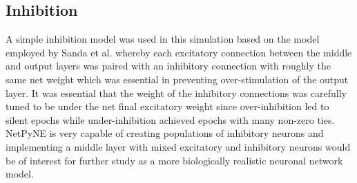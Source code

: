 \documentclass[11pt, twocolumn]{article}
\begin{document}
\subsection*{Inhibition}
A simple inhibition model was used in this simulation based on the model employed by Sanda et al. \cite{sanda2017multi} whereby each excitatory connection between the middle and output layers was paired with an inhibitory connection with roughly the same net weight which was essential in preventing over-stimulation of the output layer. It was essential that the weight of the inhibitory connections was carefully tuned to be under the net final excitatory weight since over-inhibition led to silent epochs while under-inhibition achieved epochs with many non-zero ties. \acs{NetPyNE} is very capable of creating populations of inhibitory neurons and implementing a middle layer with mixed excitatory and inhibitory neurons would be of interest for further study as a more biologically realistic neuronal network model.
\end{document}
